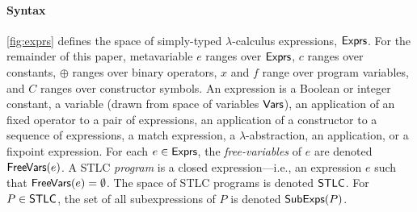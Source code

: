 \paragraph{Syntax} \autoref{fig:exprs} defines the space of
simply-typed $\lambda$-calculus expressions, $\mathsf{Exprs}$.
%
For the remainder of this paper, metavariable $e$ ranges over
$\mathsf{Exprs}$, %
$c$ ranges over constants, %
$\oplus$ ranges over binary operators, $x$ and $f$ range over
program variables, and $C$ ranges over constructor symbols.
%
An expression is a Boolean or integer constant, %
a variable (drawn from space of variables $\mathsf{Vars}$), %
an application of an fixed operator to a pair of expressions, %
an application of a constructor to a sequence of expressions, %
a match expression, %
a $\lambda$-abstraction, %
an application, or %
a fixpoint expression.
%
For each $e \in \mathsf{Exprs}$, the \emph{free-variables} of $e$ are denoted
$\mathsf{FreeVars}(e)$.
%
A STLC \emph{program} is a closed expression---i.e., an expression $e$
such that $\mathsf{FreeVars}(e) = \emptyset$.
%
The space of STLC programs is denoted $\mathsf{STLC}$.
%
For $P \in \mathsf{STLC}$, the set of all subexpressions of $P$ is denoted
$\mathsf{SubExps}(P)$.

